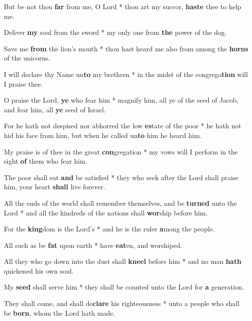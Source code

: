 \begin{multicols}{2}
	But be not thou \textbf{far} from me, O Lord * thou art my succor, \textbf{haste} thee to help me.
	
	Deliver \textbf{my} soul from the sword * my only one from \textbf{the} power of the dog.
	
	Save me \textbf{from} the lion's mouth * thou hast heard me also from among the \textbf{horns} of the unicorns.
	
	I will declare thy Name un\textbf{to} my brethren * in the midst of the congrega\textbf{tion} will I praise thee.
	
	O praise the Lord, \textbf{ye} who fear him * magnify him, all ye of the seed of Jacob, and fear him, all \textbf{ye} seed of Israel.
	
	For he hath not despised nor abhorred the low \textbf{es}tate of the poor * he hath not hid his face from him, but when he called un\textbf{to} him he heard him.
	
	My praise is of thee in the great \textbf{con}gregation * my vows will I perform in the sight \textbf{of} them who fear him.
	
	The poor shall eat \textbf{and} be satisfied * they who seek after the Lord shall praise him, your heart \textbf{shall} live forever.
	
	All the ends of the world shall remember themselves, and be \textbf{turned} unto the Lord * and all the kindreds of the nations shall \textbf{wor}ship before him.
	
	For the \textbf{king}dom is the Lord's * and he is the ruler \textbf{a}mong the people.
	
	All such as be \textbf{fat} upon earth * have \textbf{eat}en, and worshiped.
	
	All they who go down into the dust shall \textbf{kneel} before him * and no man \textbf{hath} quickened his own soul.
	
	My \textbf{seed} shall serve him * they shall be counted unto the Lord for \textbf{a} generation.
	
	They shall come, and shall de\textbf{clare} his righteousness * unto a people who shall be \textbf{born}, whom the Lord hath made.
\end{multicols}